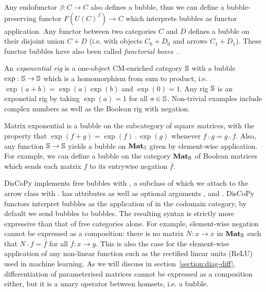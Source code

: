 \begin{example}\label{example:endofunctor-bubbles}
Any endofunctor $\beta : C \to C$ also defines a bubble, thus we can define a bubble-preserving functor $F(U(C)^\beta) \to C$ which interprets bubbles as functor application.
Any functor between two categories $C$ and $D$ defines a bubble on their disjoint union $C + D$ (i.e. with objects $C_0 + D_0$ and arrows $C_1 + D_1$).
These functor bubbles have also been called \emph{functorial boxes}~\cite{Mellies06}.
\end{example}

\begin{example}
An \emph{exponential rig} is a one-object CM-enriched category $\S$ with a bubble $\exp : \S \to \S$ which is a homomorphism from sum to product, i.e. $\exp(a + b) = \exp(a) \exp(b)$ and $\exp(0) = 1$.
Any rig $\S$ is an exponetial rig by taking $\exp(a) = 1$ for all $a \in \S$.
Non-trivial examples include complex numbers as well as the Boolean rig with negation.
\end{example}

\begin{example}
Matrix exponential is a bubble on the subcategory of square matrices, with the property that $\exp(f + g) = \exp(f) \fcmp \exp(g)$ whenever $f \fcmp g = g \fcmp f$.
Also, any function $\S \to \S$ yields a bubble on $\mathbf{Mat}_\S$ given by element-wise application.
For example, we can define a bubble on the category $\mathbf{Mat}_\B$ of Boolean matrices which sends each matrix $f$ to its entrywise negation $\bar{f}$.
\end{example}

DisCoPy implements free bubbles with , a subclass of  which we attach to the arrow class with .
 has attributes  as well as optional arguments ,  and .
DisCoPy functors interpret bubbles as the application of  in the codomain category, by default we send bubbles to bubbles.
The resulting syntax is strictly more expressive than that of free categories alone.
For example, element-wise negation cannot be expressed as a composition: there is no matrix $N : x \to x$ in $\mathbf{Mat}_\B$ such that $N \fcmp f = \bar{f}$ for all $f : x \to y$.
This is also the case for the element-wise application of any non-linear function such as the rectified linear units (ReLU) used in machine learning.
As we will discuss in section~\ref{section:diag-diff}, differentiation of parameterised matrices cannot be expressed as a composition either, but it is a unary operator between homsets, i.e. a bubble.

